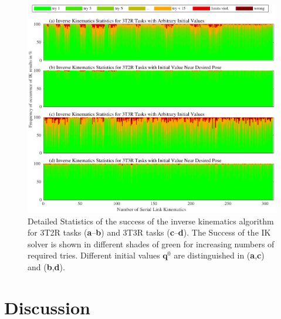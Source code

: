 \documentclass[robotics,article,accept,moreauthors,pdftex]{Definitions/mdpi}
\newcommand{\bm}[1]{\boldsymbol{#1}}
\begin{document}
\begin{figure}[tb]
    \includegraphics{serrob_ik_hist_all.pdf}
    \caption{Detailed Statistics of the success of the inverse kinematics algorithm for 3T2R tasks (\textbf{a}--\textbf{b}) and 3T3R tasks (\textbf{c}--\textbf{d}). The Success of the IK solver is shown in different shades of green for increasing numbers of required tries. Different initial values $\bm{q}^0$ are distinguished in (\textbf{a},\textbf{c}) and (\textbf{b},\textbf{d}).}
    \label{fig:serrob_ik_hist}
\end{figure} 


\section{Discussion}

\end{document}
